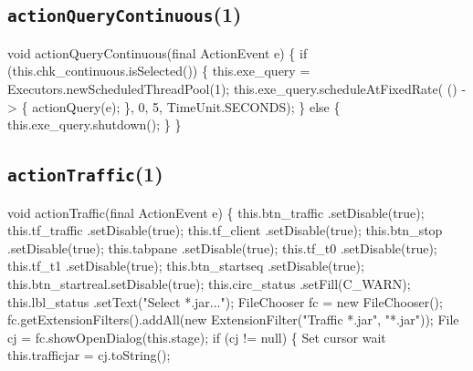 \subsection{\texttt{actionQueryContinuous}(1)}
\nwenddocs{}\endmoddef{}
void actionQueryContinuous(final ActionEvent e) \{
  if (this.chk_continuous.isSelected()) \{
    this.exe_query = Executors.newScheduledThreadPool(1);
    this.exe_query.scheduleAtFixedRate(
        () -> \{ actionQuery(e); \}, 0, 5, TimeUnit.SECONDS);
  \} else \{
    this.exe_query.shutdown();
  \}
\}
\eatline
{}\nwendcode{}\nwdocspar
\subsection{\texttt{actionTraffic}(1)}
\nwenddocs{}\endmoddef{}
void actionTraffic(final ActionEvent e) \{
  this.btn_traffic  .setDisable(true);
  this.tf_traffic   .setDisable(true);
  this.tf_client    .setDisable(true);
  this.btn_stop     .setDisable(true);
  this.tabpane      .setDisable(true);
  this.tf_t0        .setDisable(true);
  this.tf_t1        .setDisable(true);
  this.btn_startseq .setDisable(true);
  this.btn_startreal.setDisable(true);
  this.circ_status  .setFill(C_WARN);
  this.lbl_status   .setText("Select *.jar...");
  FileChooser fc = new FileChooser();
  fc.getExtensionFilters().addAll(new ExtensionFilter("Traffic *.jar", "*.jar"));
  File cj = fc.showOpenDialog(this.stage);
  if (cj != null) \{
    \LA{}Set cursor wait~{\nwtagstyle{}}\RA{}
    this.trafficjar = cj.toString();

